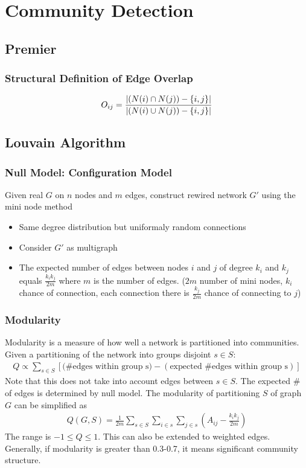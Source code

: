 \chapter{Community Detection}

\section{Premier}
\subsection{Structural Definition of Edge Overlap} 
    \begin{align*}
        O_{ij} = \frac{\left| (N(i) \cap N(j)) - \{ i, j \} \right|}{\left| (N(i) \cup N(j)) - \{ i, j \} \right|}
    \end{align*}

\section{Louvain Algorithm} 
\subsection{Null Model: Configuration Model}
Given real $G$ on $n$ nodes and $m$ edges, construct rewired network $G'$ using the mini node method
    \begin{itemize}
        \item Same degree distribution but uniformaly random connections 
        \item Consider $G'$ as multigraph 
        \item The expected number of edges between nodes $i$ and $j$ of degree $k_i$ and $k_j$ equals $\frac{k_i k_j}{2m}$ where $m$ is the number of edges. ($2m$ number of mini nodes, $k_i$ chance of connection, each connection there is $\frac{k_j}{2m}$ chance of connecting to $j$)
    \end{itemize}
    
\subsection{Modularity} 
Modularity is a measure of how well a network is partitioned into communities. Given a partitioning of the network into groups disjoint $s\in S$: 
    \begin{align*}
        Q \propto \sum_{s\in S}[\textrm{(\# edges within group s})  - (\textrm{expected \# edges within group s})]
    \end{align*}
Note that this does not take into account edges between $s\in S$. The expected \# of edges is determined by null model. The modularity of partitioning $S$ of graph $G$ can be simplified as 
    \begin{align*}
        Q(G,S) = \frac{1}{2m}\sum_{s\in S} \sum_{i\in s} \sum_{j\in s}(A_{ij} - \frac{k_i k_j}{2m})
    \end{align*}
The range is $-1 \leq Q \leq 1$. This can also be extended to weighted edges. Generally, if modularity is greater than 0.3-0.7, it means significant community structure. 

